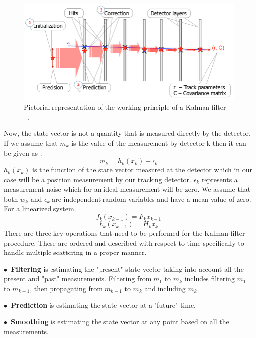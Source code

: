 \begin{figure}[t!]
\centering
\includegraphics[width=\textwidth]{thesis_figures/KALMAN.png}
\caption{Pictorial representation of the working principle of a Kalman filter ~\cite{article_KALMAN}.}
\label{fig:Kalman_filter}
\end{figure}

Now, the state vector is not a quantity that is measured directly by the detector. If we assume that $m_k$ is the value of the measurement by detector k then it can be given as :
\begin{equation}
  m_k = h_k(x_k) + \epsilon_k
\end{equation}
$h_k(x_k)$ is the function of the state vector measured at the detector which in our case will be a position measurement by our tracking detector. $\epsilon_k$ represents a measurement noise which for an ideal measurement will be zero. We assume that both $w_k$ and $\epsilon_k$ are independent random variables and have a mean value of zero.
For a linearized system,
\begin{equation}
  f_k(x_{k-1}) = F_k x_{k-1}
\end{equation}
\begin{equation}
  h_k(x_{k-1}) = H_k x_k
\end{equation}
There are three key operations that need to be performed for the Kalman filter procedure. These are ordered and described with respect to time specifically to handle multiple scattering in a proper manner.
\begin{description}
  \item $\bullet$~\textbf{Filtering} is estimating the "present" state vector taking into account all the present and "past" measurements. Filtering from $m_1$ to $m_k$ includes filtering $m_1$ to $m_{k-1}$, then propagating from $m_{k-1}$ to $m_k$ and including $m_k$.
  \item $\bullet$~\textbf{Prediction} is estimating the state vector at a "future" time.
  \item $\bullet$~\textbf{Smoothing} is estimating the state vector at any point based on all the measurements.
\end{description}

